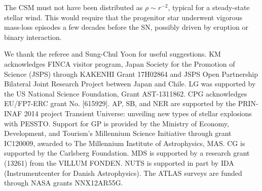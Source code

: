 \documentclass[twocolumn]{aastex61}
\begin{document}
The CSM must not have been distributed as $\rho \sim r^{-2}$, typical for a steady-state stellar wind. This would require that the progenitor star underwent vigorous mass-loss episodes a few decades before the SN, possibly driven by eruption or binary interaction.




\acknowledgments

{We thank the referee and Sung-Chul Yoon for useful suggestions}.
KM acknowledges FINCA visitor program, Japan Society for the Promotion of Science (JSPS) through KAKENHI Grant 17H02864 and JSPS Open Partnership Bilateral Joint Research Project between Japan and Chile.
LG was supported by the US National Science Foundation, Grant AST-1311862.
CPG acknowledges EU/FP7-ERC grant No. [615929].
AP, SB, and NER are supported by the PRIN-INAF 2014 project Transient Universe: unveiling new types of stellar explosions with PESSTO.
Support for GP is provided by the Ministry of Economy, Development, and Tourism's Millennium Science Initiative through grant IC120009, awarded to The Millennium Institute of Astrophysics, MAS.
CG is supported by the Carlsberg Foundation. 
MDS is supported by a research grant (13261) from the VILLUM FONDEN. NUTS is supported in part by IDA (Instrumentcenter for Danish Astrophysics).
The ATLAS surveys are funded through NASA grants NNX12AR55G.
 
%

\vspace{5mm}
\end{document}
